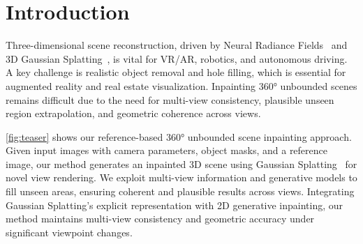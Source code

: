 \section{Introduction}
\label{sec:intro}
Three-dimensional scene reconstruction, driven by Neural Radiance Fields~\cite{mildenhall2020nerf} and 3D Gaussian Splatting~\cite{kerbl20233d}, is vital for VR/AR, robotics, and autonomous driving. A key challenge is realistic object removal and hole filling, which is essential for augmented reality and real estate visualization. Inpainting 360° unbounded scenes remains difficult due to the need for multi-view consistency, plausible unseen region extrapolation, and geometric coherence across views.

\cref{fig:teaser} shows our reference-based 360° unbounded scene inpainting approach. Given input images with camera parameters, object masks, and a reference image, our method generates an inpainted 3D scene using Gaussian Splatting~\citep{kerbl20233d,huang20242d} for novel view rendering. We exploit multi-view information and generative models to fill unseen areas, ensuring coherent and plausible results across views. Integrating Gaussian Splatting’s explicit representation with 2D generative inpainting, our method maintains multi-view consistency and geometric accuracy under significant viewpoint changes.

